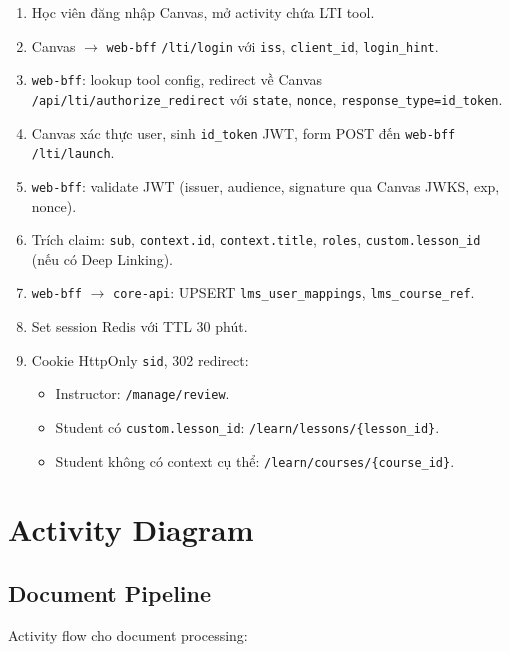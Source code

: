 \begin{enumerate}
    \item Học viên đăng nhập Canvas, mở activity chứa LTI tool.
    \item Canvas $\to$ \texttt{web-bff} \texttt{/lti/login} với
          \texttt{iss}, \texttt{client\_id}, \texttt{login\_hint}.
    \item \texttt{web-bff}: lookup tool config, redirect về Canvas
          \texttt{/api/lti/authorize\_redirect} với
          \texttt{state}, \texttt{nonce}, \texttt{response\_type=id\_token}.
    \item Canvas xác thực user, sinh \texttt{id\_token} JWT, form POST đến
          \texttt{web-bff} \texttt{/lti/launch}.
    \item \texttt{web-bff}: validate JWT (issuer, audience, signature qua
          Canvas JWKS, exp, nonce).
    \item Trích claim: \texttt{sub}, \texttt{context.id},
          \texttt{context.title}, \texttt{roles},
          \texttt{custom.lesson\_id} (nếu có Deep Linking).
    \item \texttt{web-bff} $\to$ \texttt{core-api}:
          UPSERT \texttt{lms\_user\_mappings},
          \texttt{lms\_course\_ref}.
    \item Set session Redis với TTL 30 phút.
    \item Cookie HttpOnly \texttt{sid}, 302 redirect:
        \begin{itemize}
            \item Instructor: \texttt{/manage/review}.
            \item Student có \texttt{custom.lesson\_id}:
                  \texttt{/learn/lessons/\{lesson\_id\}}.
            \item Student không có context cụ thể:
                  \texttt{/learn/courses/\{course\_id\}}.
        \end{itemize}
\end{enumerate}

\section{Activity Diagram}

\subsection{Document Pipeline}

Activity flow cho document processing:

